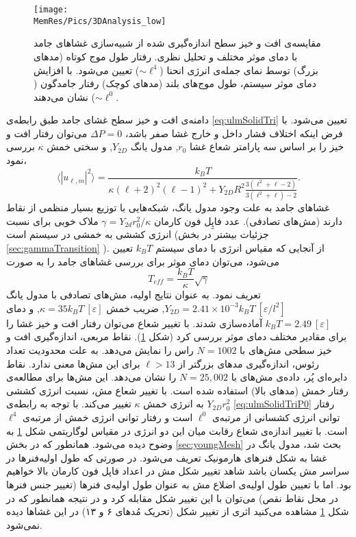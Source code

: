 \begin{figure}[htbp]
\begin{center}
\texttt{[image: \\MemRes/Pics/3DAnalysis\_low]}
\caption{
مقایسه‌ی افت و خیز سطح اندازه‌گیری شده از شبیه‌سازی غشا‌های جامد با دمای‌ موثر مختلف و تحلیل نظری. رفتار طول موج کوتاه (مد‌های بزرگ) توسط نمای جمله‌ی انرژی انحنا 
($\sim \ell^{4}$)
تعیین می‌شود. با افزایش دمای موثر سیستم، طول موج‌های بلند (مد‌های کوچک) رفتار جامدگون
($\sim \ell^{0}$)
 نشان می‌دهند.
}
\label{fig:3DAnalysis_low}
\end{center}
\end{figure}

دامنه‌ی افت و خیز سطح غشای جامد طبق رابطه‌ی 
\ref{eq:ulmSolidTri}
تعیین می‌شود. با فرض اینکه اختلاف فشار داخل و خارج غشا صفر باشد،
$\Delta P =0$
می‌توان رفتار افت و خیز را بر اساس سه پارامتر شعاع غشا
$r_0$,
مدول یانگ 
$Y_{2D}$,
 و سختی خمش 
$\kappa$
بررسی نمود، 
\begin{equation}
\langle|u_{\ell,m}|^2\rangle=\frac{k_BT}{\kappa(\ell+2)^2(\ell-1)^2+Y_{2D}R^2\frac{3(\ell^2+\ell-2)}{3(\ell^2+\ell)-2}}.
\label{eq:ulmSolidTriP0}
\end{equation}
غشا‌های جامد به علت وجود مدول یانگ، شبکه‌هایی با توزیع بسیار منظمی از نقاط دارند (مش‌های تصادفی). عدد فاپِل فون کارمان
$\gamma=Y_{2d}r_0^2/\kappa$
ملاک خوبی برای نسبت انرژی کششی به خمشی در سیستم است (جزئیات بیشتر در بخش 
\ref{sec:gammaTransition}
). از آنجایی که مقیاس انرژی با دمای سیستم
$k_BT$
تعیین می‌شود، می‌توان دمای موثر برای بررسی غشاهای جامد را به صورت
\cite{gomppernelson2012}
\begin{equation}
T_{eff}=\frac{k_BT}{\kappa}\sqrt{\gamma}
\label{eq:ulmSolidTriP0}
\end{equation}
تعریف نمود. به عنوان نتایج اولیه، مش‌های تصادفی با مدول یانگ
$Y_{2D}=2.41\times10^{-3}k_BT~[\varepsilon/l^2]$,
 ضریب خمش
$\kappa=35k_BT~[\varepsilon]$,
 و دمای 
$k_BT=2.49~[\varepsilon]$
آماده‌سازی شدند. با تغییر شعاع می‌توان رفتار افت و خیز غشا‌ را برای مقادیر مختلف  دمای موثر بررسی کرد (شکل
\ref{fig:3DAnalysis_low}).
 نقاط مربعی، اندازه‌گیری افت و خیز سطحی مش‌های با 
$N=1002$
راس را نمایش می‌دهد. به علت محدودیت تعداد رئوس، اندازه‌گیری مد‌های بزرگتر از 
$\ell>13$
برای این مش‌ها معنی ندارد. نقاط دایره‌ای پُر، داده‌ی مش‌های با 
$N=25,002$
را نشان می‌دهد. این مش‌ها برای مطالعه‌ی رفتار خمش (مد‌های بالا) استفاده شده است. با تغییر شعاع مش، نسبت انرژی کششی 
$Y_{2D}r_0^2$
به انرژی خمش
$\kappa$
تغییر می‌کند. با توجه به رابطه‌ی
\ref{eq:ulmSolidTriP0}
رفتار توانی انرژی کشسانی از مرتبه‌ی 
$\ell^0$
است و رفتار توانی انرژی خمش از مرتبه‌ی
$\ell^4$
است. با تغییر اندازه‌ی شعاع رقابت میان این دو انرژی در مقیاس لوگاریتمی شکل
\ref{fig:3DAnalysis_low}
به وضوح دیده می‌شود. همانطور که در بخش 
\ref{sec:youngMesh}
بحث شد، مدول یانگ در غشا به شکل فنر‌های هارمونیک تعریف می‌شود. در صورتی که طول‌ اولیه‌فنر‌ها در سراسر مش یکسان باشد شاهد تغییر شکل مش در اعداد فاپل فون کارمان بالا خواهیم بود. اما با تعیین طول اولیه‌ی  اضلاع مش به عنوان طول اولیه‌ی فنرها (تغییر جنس فنر‌ها در محل نقاط نقص) می‌توان با این تغییر شکل مقابله کرد و در نتیجه همانطور که در شکل 
\ref{fig:3DAnalysis_low}
مشاهده می‌کنید اثری از تغییر شکل (تحریک مُدهای ۶ و ۱۳) در این غشا‌ها دیده نمی‌شود.


